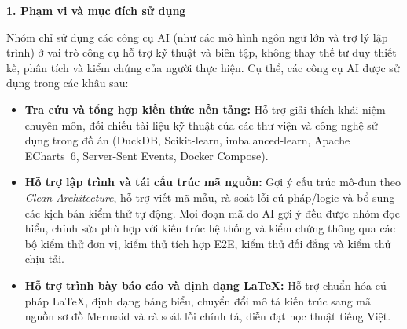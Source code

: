 \medskip

\noindent\textbf{1. Phạm vi và mục đích sử dụng}

Nhóm chỉ sử dụng các công cụ AI (như các mô hình ngôn ngữ lớn và trợ lý lập trình) ở vai trò công cụ hỗ trợ kỹ thuật và biên tập, không thay thế tư duy thiết kế, phân tích và kiểm chứng của người thực hiện. Cụ thể, các công cụ AI được sử dụng trong các khâu sau:
\begin{itemize}[topsep=4pt, itemsep=3pt]
	\item \textbf{Tra cứu và tổng hợp kiến thức nền tảng:} Hỗ trợ giải thích khái niệm chuyên môn, đối chiếu tài liệu kỹ thuật của các thư viện và công nghệ sử dụng trong đồ án (DuckDB, Scikit-learn, imbalanced-learn, Apache ECharts~6, Server-Sent Events, Docker Compose).
	\item \textbf{Hỗ trợ lập trình và tái cấu trúc mã nguồn:} Gợi ý cấu trúc mô-đun theo \textit{Clean Architecture}, hỗ trợ viết mã mẫu, rà soát lỗi cú pháp/logic và bổ sung các kịch bản kiểm thử tự động. Mọi đoạn mã do AI gợi ý đều được nhóm đọc hiểu, chỉnh sửa phù hợp với kiến trúc hệ thống và kiểm chứng thông qua các bộ kiểm thử đơn vị, kiểm thử tích hợp E2E, kiểm thử đối đẳng và kiểm thử chịu tải.
	\item \textbf{Hỗ trợ trình bày báo cáo và định dạng \LaTeX{}:} Hỗ trợ chuẩn hóa cú pháp \LaTeX{}, định dạng bảng biểu, chuyển đổi mô tả kiến trúc sang mã nguồn sơ đồ Mermaid và rà soát lỗi chính tả, diễn đạt học thuật tiếng Việt.
\end{itemize}


